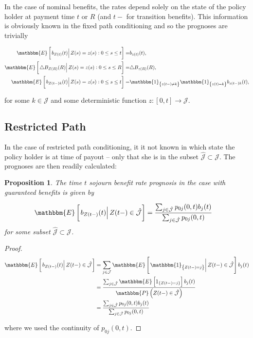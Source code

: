 \documentclass{article}
\newcommand{\1}[1]{\mathbbm{1}_{\left\lbrace #1 \right\rbrace}}
\newcommand{\expec}[1][def]{\mathbbm{E} \left[ #1 \right]}
\newcommand{\econd}[2][def]{\mathbbm{E} \left[ \left. #1 \right| #2 \right]}
\newcommand{\probability}[1][def]{\mathbbm{P} \left( #1 \right)}
\theoremstyle{break}
\newtheorem{proposition}[definition]{Proposition}%
\theoremstyle{remark}
\numberwithin{equation}{section}
\begin{document}
In the case of nominal benefits, the rates depend solely on the state of the policy holder at payment time $t$ or $R$ (and $t-$ for transition benefits). This information is obviously known in the fixed path conditioning and so the prognoses are trivially

\begin{align*}
	\econd[b_{Z(t)}(t)]{Z(s) = z(s) : 0 \leq s \leq t} =& b_{z(t)}(t), \\
	\econd[\triangle B_{Z(R)}(R)]{Z(s) = z(s) : 0 \leq s \leq R} =& \triangle B_{z(R)}(R), \\
	\econd[b_{Z(t-)k}(t)]{ Z(s) = z(s) : 0 \leq s \leq t} =& \1{z(t-) \neq k} \1{z(t) = k} b_{z(t-) k}(t),
\end{align*}

for some $k \in \mathcal{J}$ and some deterministic function $z: [0,t] \to \mathcal{J}$.

\subsection{Restricted Path}

In the case of restricted path conditioning, it it not known in which state the policy holder is at time of payout -- only that she is in the subset $\hat{\mathcal{J}} \subset \mathcal{J}$. The prognoses are then readily calculated:

\begin{proposition} \label{SojournWithoutBonus}
The time $t$ sojourn benefit rate prognosis in the case with guaranteed benefits is given by

\begin{align*}
    \econd[b_{Z(t-)}(t)]{Z(t-) \in \hat{\mathcal{J}}}
    &= \frac{\sum_{j \in \hat{\mathcal{J}}} p_{0j}(0,t) b_j(t)}{\sum_{j \in \hat{\mathcal{J}}} p_{0j}(0,t)}
\end{align*}
for some subset $\hat{\mathcal{J}} \subset \mathcal{J}$.
\end{proposition}

\begin{proof}
\begin{align*}
   	\econd[b_{Z(t-)}(t)]{Z(t-) \in \hat{\mathcal{J}}} &= \sum_{j \in \mathcal{J}} \econd[\1{Z(t-)=j}]{Z(t-) \in \hat{\mathcal{J}}} b_j(t) \\
    &= \frac{\sum_{j \in \hat{\mathcal{J}}} \expec[ 1_{\{Z(t-)=j\}} ] b_j(t)}{\probability[Z(t-) \in \hat{\mathcal{J}}]} \\
    &= \frac{\sum_{j \in \hat{\mathcal{J}}} p_{0j}(0,t) b_j(t)}{\sum_{j \in \hat{\mathcal{J}}} p_{0j}(0,t)}
\end{align*}

where we used the continuity of $p_{0j}(0,t)$.
\end{proof}
\end{document}
